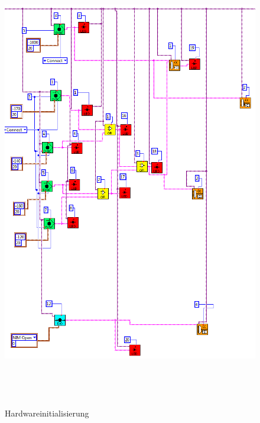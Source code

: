 \begin{figure}[h]
\centering
\includegraphics[height=20cm]{data/friedrich/prog_init.png}
\caption{Hardwareinitialisierung}
\label{fig:prog_init}
\end{figure}

